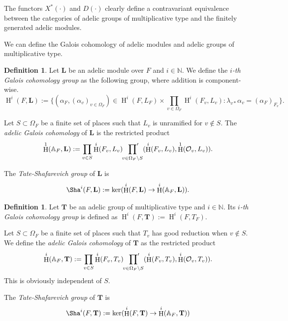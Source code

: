 \documentclass[a4paper,11pt,reqno]{amsart}
\newcommand{\N}{\mathbb{N}}\newcommand{\Z}{\mathbb{Z}}
\newcommand{\A}{\mathbb{A}}
\DeclareMathOperator{\HH}{H}
\theoremstyle{definition}
\newtheorem{definition}[theorem]{Definition}
\begin{document}
The functors $X^*(\cdot)$ and $D(\cdot)$ clearly define a contravariant equivalence between the categories of adelic groups of multiplicative type and the finitely generated adelic modules.

We can define the Galois cohomology of adelic modules and adelic groups of multiplicative type.
\begin{definition}
	Let $\mathbf{L}$ be an adelic module over $F$ and $i \in \N$. We define the \emph{$i$-th Galois cohomology group} as the following group, where addition is component-wise.
	\begin{equation*}
		\HH^i(F, \mathbf{L}) := \{(\alpha_F, (\alpha_v)_{v \in \Omega_F}) \in \HH^i(F, L_F) \times \prod_{v \in \Omega_F} \HH^i(F_v, L_v) : \lambda_{v*} \alpha_v = (\alpha_F)_{F_v}\}.
	\end{equation*}

	Let $S \subset \Omega_F$ be a finite set of places such that $L_v$ is unramified for $v \not \in S$. The \emph{adelic Galois cohomology} of $\mathbf{L}$ is the restricted product
	\begin{equation*}
		\HH^1(\A_F, \mathbf{L}) := \prod_{v \in S} \HH^i(F_v, L_v) \sideset{}{'}\prod_{v \in \Omega_F \setminus S} (\HH^i(F_v, L_v), \HH^1(\mathcal{O}_v, L_v)).
	\end{equation*}

	The \emph{Tate-Shafarevich group} of $\mathbf{L}$ is 
	\begin{equation*}
		\Sha^i(F, \mathbf{L}) := \ker(\HH^i(F, \mathbf{L}) \to 	\HH^i(\A_F, \mathbf{L})).
	\end{equation*}
\end{definition}
\begin{definition}
	Let $\mathbf{T}$ be an adelic group of multiplicative type and $i \in \N$. Its \emph{$i$-th Galois cohomology group} is defined as $\HH^i(F, \mathbf{T}) := \HH^i(F, T_F)$.
	
	Let $S \subset \Omega_F$ be a finite set of places such that $T_v$ has good reduction when $v \not \in S$. We define the \emph{adelic Galois cohomology} of $\mathbf{T}$ as the restricted product
	\begin{equation*}
		\HH^i(\A_F, \mathbf{T}) := \prod_{v \in S} \HH^i(F_v, T_v) \sideset{}{'}\prod_{v \in \Omega_F \setminus S} (\HH^i(F_v, T_v) , \HH^i(\mathcal{O}_v, T_v)).
	\end{equation*}
	This is obviously independent of $S$.
	
	The \emph{Tate-Shafarevich group} of $\mathbf{T}$ is
	\begin{equation*}
		\Sha^i(F, \mathbf{T}) := \ker(\HH^i(F, \mathbf{T}) \to 	\HH^i(\A_F, \mathbf{T}))
	\end{equation*} 
\end{definition}
\end{document}
